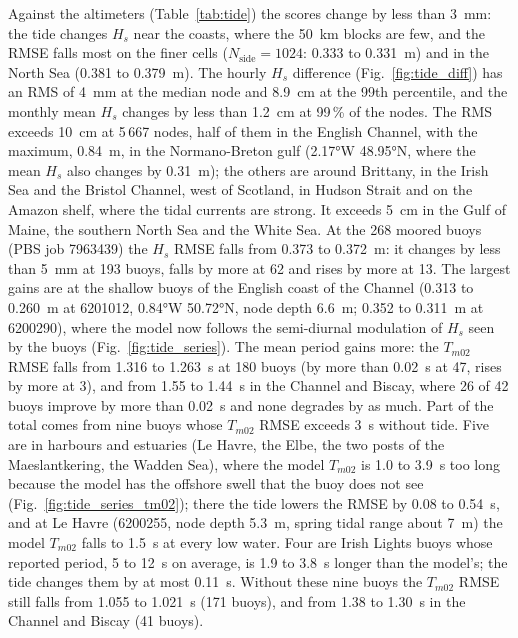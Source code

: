 \documentclass[11pt,a4paper]{article}
\newcommand{\nside}{N_{\mathrm{side}}}
\begin{document}
Against the altimeters (Table~\ref{tab:tide}) the scores change by less
than \SI{3}{mm}: the tide changes $H_s$ near the coasts, where the
\SI{50}{km} blocks are few, and the RMSE falls most on the finer cells
($\nside=1024$: 0.333 to \SI{0.331}{m}) and in the North Sea (0.381 to
\SI{0.379}{m}). The hourly $H_s$ difference (Fig.~\ref{fig:tide_diff}) has
an RMS of \SI{4}{mm} at the median node and \SI{8.9}{cm} at the 99th
percentile, and the monthly mean $H_s$ changes by less than \SI{1.2}{cm}
at 99\,\% of the nodes. The RMS exceeds \SI{10}{cm} at 5\,667 nodes, half
of them in the English Channel, with the maximum, \SI{0.84}{m}, in the
Normano-Breton gulf (\ang{2.17}W \ang{48.95}N, where the mean $H_s$ also
changes by \SI{0.31}{m}); the others are around Brittany, in the Irish Sea
and the Bristol Channel, west of Scotland, in Hudson Strait and on the
Amazon shelf, where the tidal currents are strong. It exceeds \SI{5}{cm}
in the Gulf of Maine, the southern North Sea and the White Sea. At the 268
moored buoys (PBS job 7963439) the $H_s$ RMSE falls from 0.373 to
\SI{0.372}{m}: it changes by less than \SI{5}{mm} at 193 buoys, falls by
more at 62 and rises by more at 13. The largest gains are at the shallow
buoys of the English coast of the Channel (0.313 to \SI{0.260}{m} at
6201012, \ang{0.84}W \ang{50.72}N, node depth \SI{6.6}{m}; 0.352 to
\SI{0.311}{m} at 6200290), where the model now follows the semi-diurnal
modulation of $H_s$ seen by the buoys (Fig.~\ref{fig:tide_series}). The
mean period gains more: the $T_{m02}$ RMSE falls from 1.316 to
\SI{1.263}{s} at 180 buoys (by more than \SI{0.02}{s} at 47, rises by more
at 3), and from 1.55 to \SI{1.44}{s} in the Channel and Biscay, where 26
of 42 buoys improve by more than \SI{0.02}{s} and none degrades by as
much. Part of the total comes from nine buoys whose $T_{m02}$ RMSE exceeds
\SI{3}{s} without tide. Five are in harbours and estuaries (Le Havre, the
Elbe, the two posts of the Maeslantkering, the Wadden Sea), where the
model $T_{m02}$ is 1.0 to \SI{3.9}{s} too long because the model has the
offshore swell that the buoy does not see
(Fig.~\ref{fig:tide_series_tm02}); there the tide lowers the RMSE by 0.08
to \SI{0.54}{s}, and at Le Havre (6200255, node depth \SI{5.3}{m}, spring
tidal range about \SI{7}{m}) the model $T_{m02}$ falls to \SI{1.5}{s} at
every low water. Four are Irish Lights buoys whose reported period, 5 to
\SI{12}{s} on average, is 1.9 to \SI{3.8}{s} longer than the model's; the
tide changes them by at most \SI{0.11}{s}. Without these nine buoys the $T_{m02}$ RMSE
still falls from 1.055 to \SI{1.021}{s} (171 buoys), and from 1.38 to
\SI{1.30}{s} in the Channel and Biscay (41 buoys).
\end{document}
